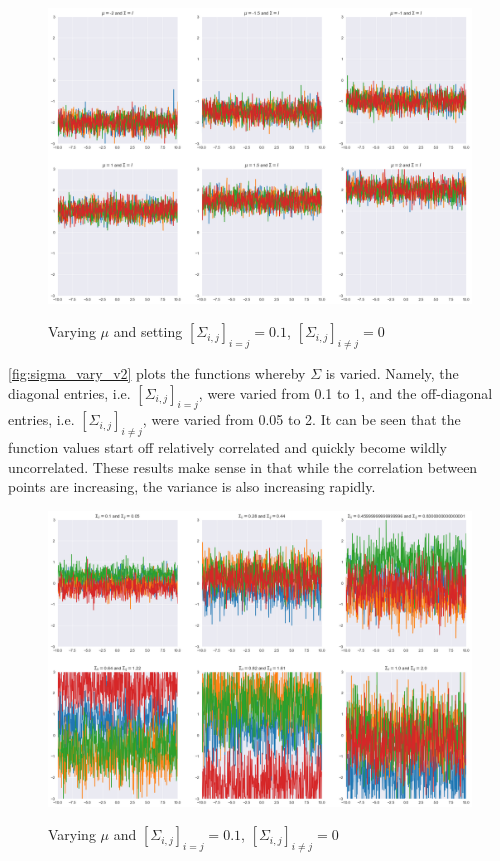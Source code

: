 \documentclass[twoside,11pt]{homework}
\DeclarePairedDelimiter{\2norm}{\lVert}{\rVert^2_2}
\newcommand{\1}[1]{\mathds{1}\left[#1\right]}
\begin{document}
\begin{figure}[H]
\centering
\caption{Varying $\mu$ and setting $[\Sigma_{i,j}]_{i = j} = 0.1$, $[\Sigma_{i,j}]_{i \neq j} = 0$}
\includegraphics[scale=0.39]{"../code/figures/part_v_mu"}
\label{fig:mu_vary}
\end{figure}
\noindent
\autoref{fig:sigma_vary_v2} plots the functions whereby $\Sigma$ is varied. Namely, the diagonal entries, i.e. $[\Sigma_{i,j}]_{i = j}$, were varied from 0.1 to 1, and the off-diagonal entries, i.e. $[\Sigma_{i,j}]_{i \neq j}$, were varied from 0.05 to 2. It can be seen that the function values start off relatively correlated and quickly become wildly uncorrelated. These results make sense in that while the correlation between points are increasing, the variance is also increasing rapidly. 

\begin{figure}[H]
\centering
\caption{Varying $\mu$ and $[\Sigma_{i,j}]_{i = j} = 0.1$, $[\Sigma_{i,j}]_{i \neq j} = 0$}
\includegraphics[scale=0.39]{"../code/figures/part_v_sigma2"}
\label{fig:sigma_vary_v2}
\end{figure}
\end{document}
